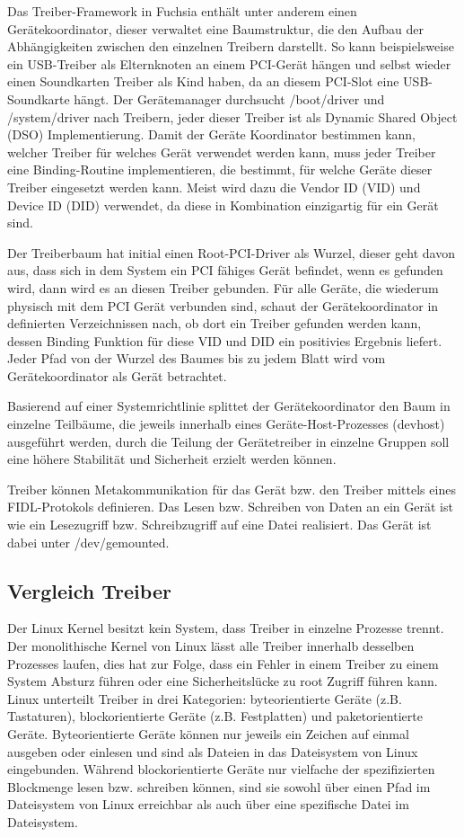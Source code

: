 \documentclass[a4paper]{scrartcl}
\begin{document}
Das Treiber-Framework in Fuchsia enthält unter anderem einen Gerätekoordinator, dieser verwaltet eine Baumstruktur, die den Aufbau der Abhängigkeiten zwischen den einzelnen Treibern darstellt. So kann beispielsweise ein USB-Treiber als Elternknoten an einem PCI-Gerät hängen und selbst wieder einen Soundkarten Treiber als Kind haben, da an diesem PCI-Slot eine USB-Soundkarte hängt. Der Gerätemanager durchsucht /boot/driver und /system/driver nach Treibern, jeder dieser Treiber ist als Dynamic Shared Object (DSO) Implementierung. Damit der Geräte Koordinator bestimmen kann, welcher Treiber für welches Gerät verwendet werden kann, muss jeder Treiber eine Binding-Routine implementieren, die bestimmt, für welche Geräte dieser Treiber eingesetzt werden kann. Meist wird dazu die Vendor ID (VID) und Device ID (DID) verwendet, da diese in Kombination einzigartig für ein Gerät sind. 

Der Treiberbaum hat initial einen Root-PCI-Driver als Wurzel, dieser geht davon aus, dass sich in dem System ein PCI fähiges Gerät befindet, wenn es gefunden wird, dann wird es an diesen Treiber gebunden. Für alle Geräte, die wiederum physisch mit dem PCI Gerät verbunden sind, schaut der Gerätekoordinator in definierten Verzeichnissen nach, ob dort ein Treiber gefunden werden kann, dessen Binding Funktion für diese VID und DID ein positivies Ergebnis liefert. Jeder Pfad von der Wurzel des Baumes bis zu jedem Blatt wird vom Gerätekoordinator als Gerät betrachtet.

Basierend auf einer Systemrichtlinie splittet der Gerätekoordinator den Baum in einzelne Teilbäume, die jeweils innerhalb eines Geräte-Host-Prozesses (devhost) ausgeführt werden, durch die Teilung der Gerätetreiber in einzelne Gruppen soll eine höhere Stabilität und Sicherheit erzielt werden können.

Treiber können Metakommunikation für das Gerät bzw. den Treiber mittels eines FIDL-Protokols definieren. Das Lesen bzw. Schreiben von Daten an ein Gerät ist wie ein Lesezugriff bzw. Schreibzugriff auf eine Datei realisiert. Das Gerät ist dabei unter /dev/gemounted.
\subsection{Vergleich Treiber}
Der Linux Kernel besitzt kein System, dass Treiber in einzelne Prozesse trennt. Der monolithische Kernel von Linux lässt alle Treiber innerhalb desselben Prozesses laufen, dies hat zur Folge, dass ein Fehler in einem Treiber zu einem System Absturz führen oder eine Sicherheitslücke zu root Zugriff führen kann. Linux unterteilt Treiber in drei Kategorien: byteorientierte Geräte (z.B. Tastaturen), blockorientierte Geräte (z.B. Festplatten) und paketorientierte Geräte. Byteorientierte Geräte können nur jeweils ein Zeichen auf einmal ausgeben oder einlesen und sind als Dateien in das Dateisystem von Linux eingebunden. Während blockorientierte Geräte nur vielfache der spezifizierten Blockmenge lesen bzw. schreiben können, sind sie sowohl über einen Pfad im Dateisystem von Linux erreichbar als auch über eine spezifische Datei im Dateisystem. 
\end{document}
